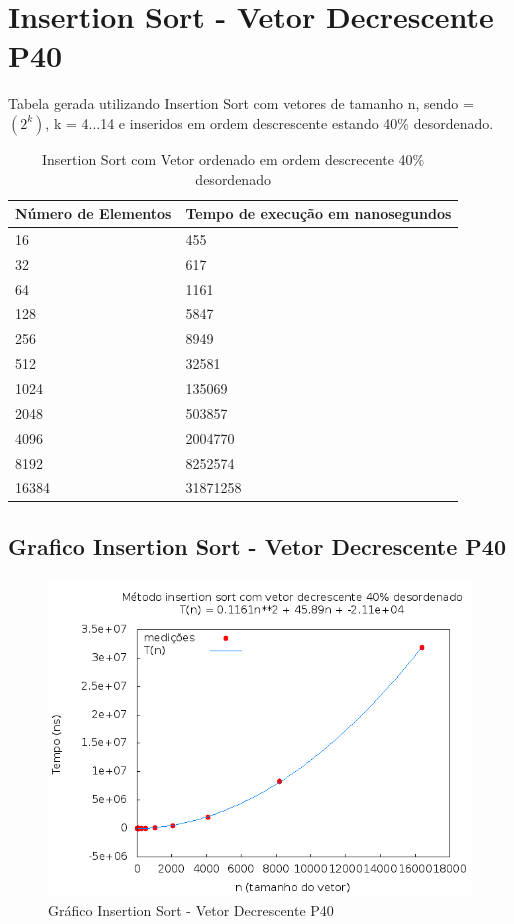 \documentclass[12pt,a4paper,twoside]{report}
\begin{document}
\section{Insertion Sort - Vetor Decrescente P40}
Tabela gerada utilizando Insertion Sort com vetores de tamanho n, sendo = $(2^k)$, k = 4...14 e inseridos em ordem descrescente estando 40\% desordenado.

\begin{table}[H]
\centering
\caption{Insertion Sort com Vetor ordenado em ordem descrecente 40\% desordenado}
\label{my-label}
\begin{tabular}{|l|l|}
\hline
\multicolumn{1}{|c|}{\textbf{Número de Elementos}} & \multicolumn{1}{c|}{\textbf{Tempo de execução em nanosegundos}} \\ \hline
16 & 455 \\ \hline
32 & 617 \\ \hline
64 & 1161 \\ \hline
128 & 5847 \\ \hline
256 & 8949 \\ \hline
512 & 32581 \\ \hline
1024 & 135069 \\ \hline
2048 & 503857 \\ \hline
4096 & 2004770 \\ \hline
8192 & 8252574 \\ \hline
16384 & 31871258 \\ \hline
\end{tabular}
\end{table}

\subsection{Grafico Insertion Sort - Vetor Decrescente P40}
\begin{figure}[H]
    \centering
    \includegraphics[width=0.7\linewidth]{graficos/Insertion/vIntDecrescenteP40/vIntDecrescenteP40.png}
  \caption{Gráfico Insertion Sort - Vetor Decrescente P40}
\end{figure}
\end{document}
